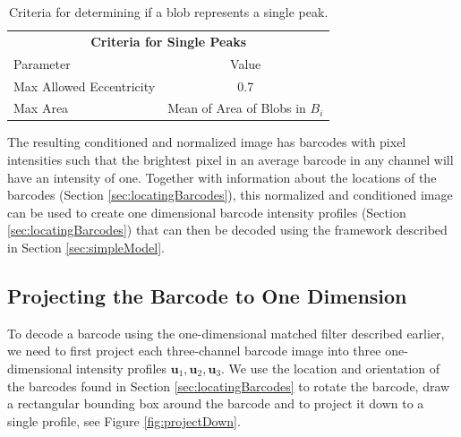 \begin{table}[htbp] 	
\begin{center}
\begin{tabular}{l c}
\multicolumn{2}{c}{\textbf{Criteria for Single Peaks}}\\
Parameter & Value \\
\hline
Max Allowed Eccentricity  & 0.7 \\
Max Area &  Mean of Area of Blobs in $B_i$ \\
\hline
\end{tabular}
\caption{Criteria for determining if a blob represents a single peak. \label{table:singlePeak}}
\end{center}
\end{table}

The resulting conditioned and normalized image has barcodes with pixel intensities such that the brightest pixel in an average barcode in any channel will have an intensity of one. Together with information about the locations of the barcodes (Section \ref{sec:locatingBarcodes}), this normalized and conditioned image can be used to create one dimensional barcode intensity profiles (Section \ref{sec:locatingBarcodes}) that can then be decoded using the framework described in Section \ref{sec:simpleModel}.

  
\subsection{Projecting the Barcode to One Dimension} \label{sec:projectDown}
	To decode a barcode using the one-dimensional matched filter described earlier, we need to first project each three-channel barcode image into three one-dimensional intensity profiles $\mathbf{u}_1, \mathbf{u}_2, \mathbf{u}_3$.  We use the location and orientation of the barcodes found in Section \ref{sec:locatingBarcodes} to rotate the barcode, draw a rectangular bounding box around the barcode and to project it down to a single profile, see Figure \ref{fig:projectDown}.


